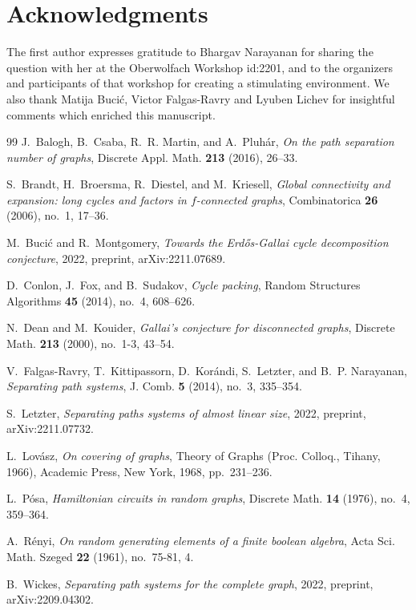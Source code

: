 \documentclass{aic}
\begin{document}
\section*{Acknowledgments}

The first author expresses gratitude to Bhargav Narayanan for sharing the question with her at the Oberwolfach Workshop id:2201, and to the organizers and participants of that workshop for creating a stimulating environment.
We also thank Matija Buci\'c, Victor Falgas-Ravry and Lyuben Lichev for insightful comments which enriched this manuscript.


\begin{thebibliography}{99}
J.~Balogh, B.~Csaba, R.~R. Martin, and A.~Pluh\'{a}r, \emph{On the path
  separation number of graphs}, Discrete Appl. Math. \textbf{213} (2016),
  26--33.

S.~Brandt, H.~Broersma, R.~Diestel, and M.~Kriesell, \emph{Global connectivity
  and expansion: long cycles and factors in {$f$}-connected graphs},
  Combinatorica \textbf{26} (2006), no.~1, 17--36.

M.~Buci{\'c} and R.~Montgomery, \emph{Towards the {E}rd{\H{o}}s-{G}allai cycle
  decomposition conjecture}, 2022, preprint, arXiv:2211.07689.

D.~Conlon, J.~Fox, and B.~Sudakov, \emph{Cycle packing}, Random Structures
  Algorithms \textbf{45} (2014), no.~4, 608--626.

N.~Dean and M.~Kouider, \emph{Gallai's conjecture for disconnected graphs},
  Discrete Math. \textbf{213} (2000), no.~1-3, 43--54.

V.~Falgas-Ravry, T.~Kittipassorn, D.~Kor\'{a}ndi, S.~Letzter, and B.~P.
  Narayanan, \emph{Separating path systems}, J. Comb. \textbf{5} (2014), no.~3,
  335--354.

S.~Letzter, \emph{Separating paths systems of almost linear size}, 2022,
  preprint, arXiv:2211.07732.

L.~Lov\'{a}sz, \emph{On covering of graphs}, Theory of {G}raphs ({P}roc.
  {C}olloq., {T}ihany, 1966), Academic Press, New York, 1968, pp.~231--236.

L.~P\'{o}sa, \emph{Hamiltonian circuits in random graphs}, Discrete Math.
  \textbf{14} (1976), no.~4, 359--364.

A.~R{\'e}nyi, \emph{On random generating elements of a finite boolean algebra},
  Acta Sci. Math. Szeged \textbf{22} (1961), no.~75-81, 4.

B.~Wickes, \emph{Separating path systems for the complete graph}, 2022,
  preprint, arXiv:2209.04302.

\end{thebibliography}
\end{document}
